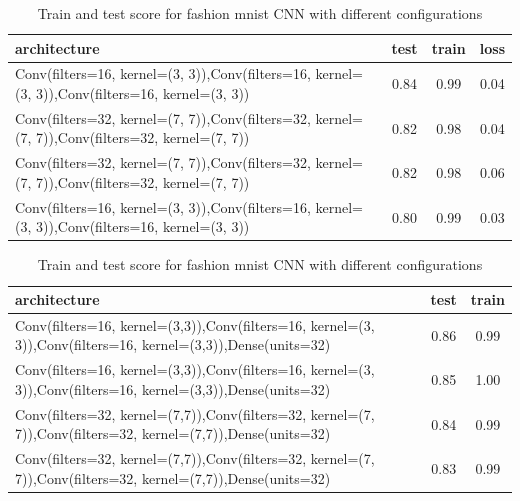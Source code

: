 \documentclass[10pt]{SelfArx} %
\begin{document}
\begin{table}[]
	\begin{tabular*}{1\linewidth}{@{\extracolsep{\fill} }lccc@{}}
		\toprule
		architecture & test & train & loss \\ \midrule
		Conv(filters=16, kernel=(3, 3)),Conv(filters=16, kernel=(3, 3)),Conv(filters=16, kernel=(3, 3)) & 0.84 & 0.99 & 0.04 \\
		Conv(filters=32, kernel=(7, 7)),Conv(filters=32, kernel=(7, 7)),Conv(filters=32, kernel=(7, 7)) & 0.82 & 0.98 & 0.04 \\
		Conv(filters=32, kernel=(7, 7)),Conv(filters=32, kernel=(7, 7)),Conv(filters=32, kernel=(7, 7)) & 0.82 & 0.98 & 0.06 \\
		Conv(filters=16, kernel=(3, 3)),Conv(filters=16, kernel=(3, 3)),Conv(filters=16, kernel=(3, 3)) & 0.80 & 0.99 & 0.03 \\ \bottomrule
	\end{tabular*}
	\caption{Train and test score for fashion mnist CNN  with different configurations}
	\label{tfashion3}
\end{table}
\begin{table}[]
	\begin{tabular*}{1\linewidth}{@{\extracolsep{\fill} }lcc@{}}
		\toprule
		architecture & test & train \\ \midrule
		Conv(filters=16, kernel=(3,3)),Conv(filters=16, kernel=(3, 3)),Conv(filters=16, kernel=(3,3)),Dense(units=32) & 0.86 & 0.99  \\
		Conv(filters=16, kernel=(3,3)),Conv(filters=16, kernel=(3, 3)),Conv(filters=16, kernel=(3,3)),Dense(units=32) & 0.85 & 1.00  \\
		Conv(filters=32, kernel=(7,7)),Conv(filters=32, kernel=(7, 7)),Conv(filters=32, kernel=(7,7)),Dense(units=32) & 0.84 & 0.99 \\
		Conv(filters=32, kernel=(7,7)),Conv(filters=32, kernel=(7, 7)),Conv(filters=32, kernel=(7,7)),Dense(units=32) & 0.83 & 0.99 \\ \bottomrule
	\end{tabular*}
	\caption{Train and test score for fashion mnist CNN  with different configurations}
	\label{tfashion4}
\end{table}
\end{document}

